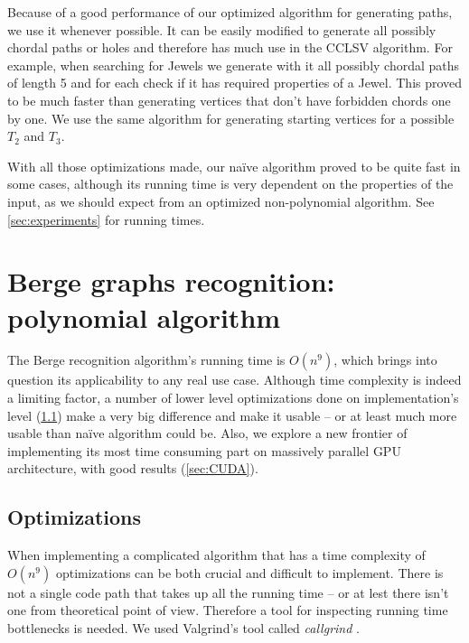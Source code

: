 Because of a good performance of our optimized algorithm for generating paths, we use it whenever possible. It can be easily modified to generate all possibly chordal paths or holes and therefore has much use in the CCLSV algorithm. For example, when searching for Jewels we generate with it all possibly chordal paths of length 5 and for each check if it has required properties of a Jewel. This proved to be much faster than generating vertices that don't have forbidden chords one by one. We use the same algorithm for generating starting vertices for a possible $T_2$ and $T_3$.

With all those optimizations made, our na\"ive algorithm proved to be quite fast in some cases, although its running time is very dependent on the properties of the input, as we should expect from an optimized non-polynomial algorithm. See \cref{sec:experiments} for running times.

\section{Berge graphs recognition: polynomial algorithm}


The Berge recognition algorithm's running time is $O(n^9)$, which brings into question its applicability to any real use case. Although time complexity is indeed a limiting factor, a number of lower level optimizations done on implementation's level (\cref{sec:Optimizations}) make a very big difference and make it usable -- or at least much more usable than na\"ive algorithm could be. Also, we explore a new frontier of implementing its most time consuming part on massively parallel GPU architecture, with good results (\cref{sec:CUDA}).


\subsection{Optimizations}
\label{sec:Optimizations}

When implementing a complicated algorithm that has a time complexity of $O(n^9)$ optimizations can be both crucial and difficult to implement. There is not a single code path that takes up all the running time -- or at lest there isn't one from theoretical point of view. Therefore a tool for inspecting running time bottlenecks is needed. We used Valgrind's tool called \emph{callgrind} \cite{callgrind}.

